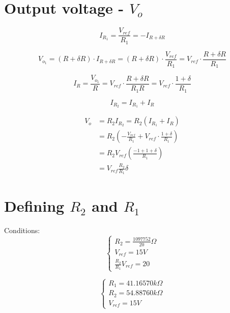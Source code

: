 \documentclass[10pt,a4paper]{book}
\begin{document}
\section{Output voltage - $V_o$}

\begin{equation} \label{I_R1}
  I_{R_1} = \frac{V_{ref}}{R_1} = - I_{R+\delta R}
\end{equation}

\begin{equation} \label{V_o1}
  V_{o_1} = (R+\delta R) \cdot I_{R+\delta R}
  = (R+\delta R) \cdot \frac{V_{ref}}{R_1}
  = V_{ref} \cdot \frac{R+\delta R}{R_1}
\end{equation}

\begin{equation} \label{I_R}
  I_R = \frac{V_{o_1}}{R} = V_{ref} \cdot \frac{R+\delta R}{R_1R}
  = V_{ref} \cdot \frac{1+\delta}{R_1}
\end{equation}

\begin{equation} \label{I_R2}
  I_{R_2} = I_{R_1} + I_R
\end{equation}

\begin{align}
  V_o &= R_2 I_{R_2} = R_2 (I_{R_1} + I_R) \nonumber \\
  &= R_2 \left(- \frac{V_{ref}}{R_1} + V_{ref} \cdot \frac{1+\delta}{R_1} \right) \nonumber \\ 
  &= R_2 V_{ref} \left( \frac{-1+1+\delta}{R_1} \right) \nonumber \\
  &= V_{ref}\frac{R_2}{R_1}\delta \label{V_o}
\end{align}

\section{Defining $R_2$ and $R_1$}
Conditions:
\begin{equation} \label{eq:conditions3}
  \left\{
    \begin{array}{l}
      R_2 = \frac{1097752}{20}\Omega \\
      V_{ref} = 15V \\
      \frac{R_2}{R_1}V_{ref} = 20
    \end{array}
  \right.
\end{equation}

\begin{equation} \label{eq:R2R1_3}
  \left\{
    \begin{array}{l}
      R_1 = 41.16570k\Omega \\
      R_2 = 54.88760k\Omega \\
      V_{ref} = 15V
    \end{array}
  \right.
\end{equation}
\end{document}
